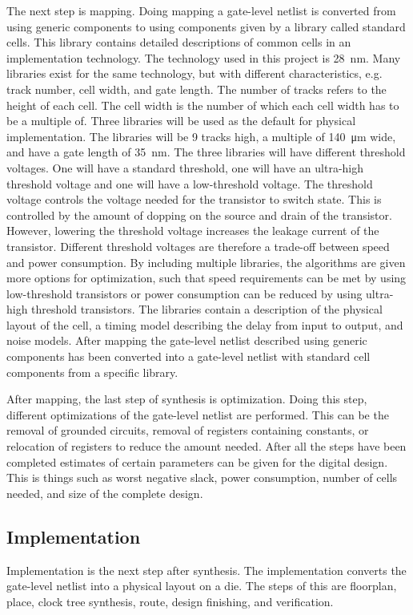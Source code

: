 The next step is mapping. Doing mapping a gate-level netlist is converted from using generic components to using components given by a library called standard cells. This library contains detailed descriptions of common cells in an implementation technology. The technology used in this project is \SI{28}{nm}. Many libraries exist for the same technology, but with different characteristics, e.g. track number, cell width, and gate length. The number of tracks refers to the height of each cell. The cell width is the number of which each cell width has to be a multiple of. Three libraries will be used as the default for physical implementation. The libraries will be 9 tracks high, a multiple of \SI{140}{\um} wide, and have a gate length of \SI{35}{nm}. The three libraries will have different threshold voltages. One will have a standard threshold, one will have an ultra-high threshold voltage and one will have a low-threshold voltage. The threshold voltage controls the voltage needed for the transistor to switch state. This is controlled by the amount of dopping on the source and drain of the transistor. However, lowering the threshold voltage increases the leakage current of the transistor. Different threshold voltages are therefore a trade-off between speed and power consumption. By including multiple libraries, the algorithms are given more options for optimization, such that speed requirements can be met by using low-threshold transistors or power consumption can be reduced by using ultra-high threshold transistors. The libraries contain a description of the physical layout of the cell, a timing model describing the delay from input to output, and noise models. After mapping the gate-level netlist described using generic components has been converted into a gate-level netlist with standard cell components from a specific library. 

After mapping, the last step of synthesis is optimization. Doing this step, different optimizations of the gate-level netlist are performed. This can be the removal of grounded circuits, removal of registers containing constants, or relocation of registers to reduce the amount needed. After all the steps have been completed estimates of certain parameters can be given for the digital design. This is things such as worst negative slack, power consumption, number of cells needed, and size of the complete design. 

\subsection{Implementation}
Implementation is the next step after synthesis. The implementation converts the gate-level netlist into a physical layout on a die. The steps of this are floorplan, place, clock tree synthesis, route, design finishing, and verification. 

